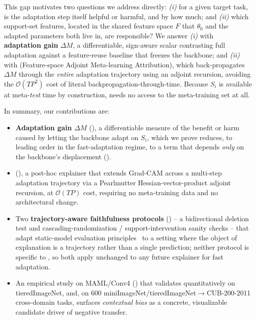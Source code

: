 This gap motivates two questions we address directly: \emph{(i)} for a given target task, is the adaptation step itself helpful or harmful, and by how much; and \emph{(ii)} which support-set features, located in the shared feature space $F$ that $\theta_0$ and the adapted parameters both live in, are responsible? We answer \emph{(i)} with \textbf{adaptation gain} $\Delta M$, a differentiable, sign-aware scalar contrasting full adaptation against a feature-reuse baseline that freezes the backbone; and \emph{(ii)} with \textbf{\fama} (Feature-space Adjoint Meta-learning Attribution), which back-propagates $\Delta M$ through the \emph{entire} adaptation trajectory using an adjoint recursion, avoiding the $\mathcal{O}(TP^2)$ cost of literal backpropagation-through-time. Because $S_i$ is available at meta-\emph{test} time by construction, \fama needs no access to the meta-training set at all.

In summary, our contributions are:
\begin{itemize}[leftmargin=*,itemsep=1pt,topsep=2pt]
    \item \textbf{Adaptation gain $\Delta M$} (), a differentiable measure of the benefit or harm caused by letting the backbone adapt on $S_i$, which we prove reduces, to leading order in the fast-adaptation regime, to a term that depends \emph{only} on the backbone's displacement ().
    \item \textbf{\fama} (), a post-hoc explainer that extends Grad-CAM across a multi-step adaptation trajectory via a Pearlmutter Hessian-vector-product adjoint recursion, at $\mathcal{O}(TP)$ cost, requiring no meta-training data and no architectural change.
    \item Two \textbf{trajectory-aware faithfulness protocols} () -- a bidirectional deletion test and cascading-randomization / support-intervention sanity checks -- that adapt static-model evaluation principles~\cite{samek2016evaluating,petsiuk2018rise,adebayo2018sanity} to a setting where the object of explanation is a trajectory rather than a single prediction; neither protocol is specific to \fama, so both apply unchanged to any future explainer for fast adaptation.
    \item An empirical study on MAML/Conv4 () that validates \fama quantitatively on tieredImageNet, and, on 600 miniImageNet/tieredImageNet$\to$CUB-200-2011 cross-domain tasks, surfaces \emph{contextual bias} as a concrete, visualizable candidate driver of negative transfer.
\end{itemize}
